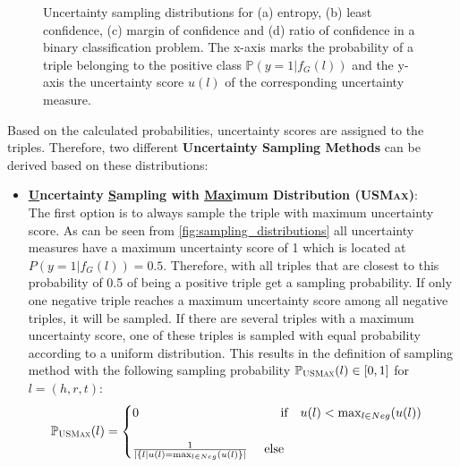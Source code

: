 \begin{figure}
\begin{minipage}{.5\textwidth}
    \end{minipage}%
    \caption{Uncertainty sampling distributions for (a) entropy, (b) least confidence, (c) margin of confidence and (d) ratio of confidence in a binary classification problem.
    The x-axis marks the probability of a triple belonging to the positive class $\mathbb{P}(y = 1 | f_G(l))$ and the y-axis the uncertainty score $u(l)$ of the corresponding uncertainty measure.}
    \label{fig:sampling_distributions}
\end{figure}

Based on the calculated probabilities, uncertainty scores are assigned to the triples.
Therefore, two different \textbf{Uncertainty Sampling Methods} can be derived based on these distributions:
\begin{itemize}
    \item 
    \textbf{\underline{U}ncertainty \underline{S}ampling with \underline{Max}imum Distribution (\textsc{USMax})}:\\
    The first option is to always sample the triple with maximum uncertainty score.
    As can be seen from \autoref{fig:sampling_distributions} all uncertainty measures have a maximum uncertainty score of 1 which is located at $P(y = 1 | f_G(l)) = 0.5$.
    Therefore, with \usmax all triples that are closest to this probability of 0.5 of being a positive triple get a sampling probability.
    If only one negative triple reaches a maximum uncertainty score among all negative triples, it will be sampled.
    If there are several triples with a maximum uncertainty score, one of these triples is sampled with equal probability according to a uniform distribution.
    This results in the definition of sampling method \usmax with the following sampling probability $\mathbb{P}_{\textsc{USMax}}(l) \in [0,1]$ for $l = (h,r,t)$:
    \begin{equation} 
        \mathbb{P}_{\usmax}(l) =
        \begin{cases}
             0 \ \ \ \ \ \ \ \ \ \ \ \ \ \  \ \ \ \ \ \ \ \ \ \ \ \ \ \ \ \ \ \ \ \ 
             \text{if}\ \ \ u(l) < \max_{l \in Neg}(u(l)) 
             \\ \\
            \frac{1}{|\{l | u(l) = \max_{l \in Neg}(u(l)\}|} 
            \ \ \ \
            \text{else} 
             \\
        \end{cases}
         \label{eq:usmax}
    \end{equation}
    

\end{itemize}
